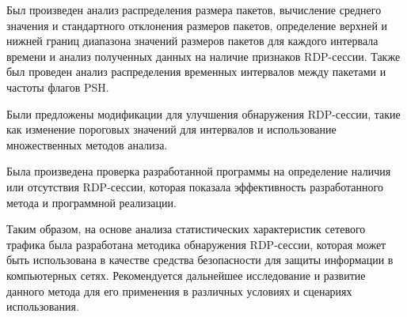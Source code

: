 \documentclass[bachelor, och, coursework]{SCWorks}
\begin{document}
Был произведен анализ распределения размера пакетов, вычисление среднего значения и стандартного отклонения размеров пакетов, определение 
верхней и нижней границ диапазона значений размеров пакетов для каждого интервала времени и анализ полученных данных на наличие признаков 
RDP-сессии. Также был проведен анализ распределения временных интервалов между пакетами и частоты флагов PSH.

Были предложены модификации для улучшения обнаружения RDP-сессии, такие как изменение пороговых значений для интервалов и использование 
множественных методов анализа.

Была произведена проверка разработанной программы на определение наличия или отсутствия RDP-сессии, которая показала эффективность 
разработанного метода и программной реализации.

Таким образом, на основе анализа статистических характеристик сетевого трафика была разработана методика обнаружения RDP-сессии, 
которая может быть использована в качестве средства безопасности для защиты информации в компьютерных сетях. 
Рекомендуется дальнейшее исследование и развитие данного метода для его применения в различных условиях и сценариях использования.
\end{document}
